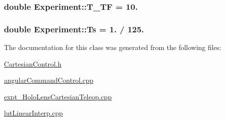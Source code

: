\subsubsection[{\texorpdfstring{T\+\_\+\+TF}{T_TF}}]{\setlength{\rightskip}{0pt plus 5cm}double Experiment\+::\+T\+\_\+\+TF = 10.}\hypertarget{classExperiment_ae4044c67ccebf1fd2370d304c2b6e6a6}{}\label{classExperiment_ae4044c67ccebf1fd2370d304c2b6e6a6}
\subsubsection[{\texorpdfstring{Ts}{Ts}}]{\setlength{\rightskip}{0pt plus 5cm}double Experiment\+::\+Ts = 1. / 125.}\hypertarget{classExperiment_ac51084a578b7edb7fa68f96d98671609}{}\label{classExperiment_ac51084a578b7edb7fa68f96d98671609}


The documentation for this class was generated from the following files\+:\begin{DoxyCompactItemize}
\item 
\hyperlink{CartesianControl_8h}{Cartesian\+Control.\+h}\item 
\hyperlink{angularCommandControl_8cpp}{angular\+Command\+Control.\+cpp}\item 
\hyperlink{expt__HoloLensCartesianTeleop_8cpp}{expt\+\_\+\+Holo\+Lens\+Cartesian\+Teleop.\+cpp}\item 
\hyperlink{lutLinearInterp_8cpp}{lut\+Linear\+Interp.\+cpp}\end{DoxyCompactItemize}
